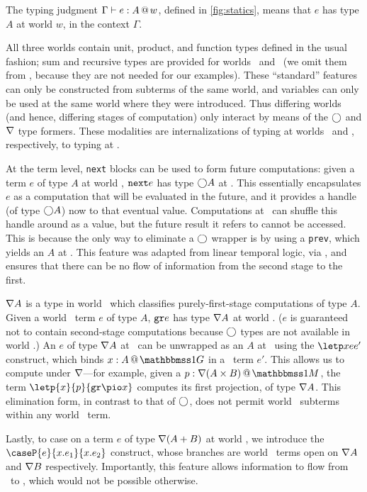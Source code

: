 \begin{abstrsyn}

The typing judgment $\Gamma{} \vdash {e}:{A}~\hspace{-0.15em}\text{@}\hspace{-0.2em}~w$, defined in \ref{fig:statics}, means that
$e$ has type $A$ at world $w$, in the context $\Gamma$. 

All three worlds contain unit, product, and function types defined in the usual fashion;
sum and recursive types are provided for worlds \bbonep\ and \bbtwo\ 
(we omit them from \bbonem, because they are not needed for our examples).
These ``standard'' features can only be constructed from subterms of the same world,
and variables can only be used at the same world where they were introduced.
Thus differing worlds (and hence, differing stages of computation) only interact by means
of the $\bigcirc$ and $\nabla$ type formers.  These modalities are internalizations
of typing at worlds \bbtwo\ and \bbonep, respectively, to typing at \bbonem.

At the term level, {\tt next} blocks can be used to form future computations:
given a term $e$ of type $A$ at world \bbtwo, ${\tt next}{e}$ has type $\bigcirc A$ at \bbonem. 
This essentially encapsulates $e$ as a computation that will be evaluated in the future, 
and it provides a handle (of type $\bigcirc A$) now to that eventual value.
Computations at \bbonem\ can shuffle this handle around as a value, but the future result it refers to cannot be accessed.
This is because the only way to eliminate a $\bigcirc$ wrapper is by using a {\tt prev}, which yields an $A$ at \bbtwo.
This feature was adapted from linear temporal logic, via \cite{davies96},
and ensures that there can be no flow of information from the second stage to the first.

$\nabla A$ is a type in world \bbonem\ which classifies purely-first-stage
computations of type $A$. Given a world \bbonep\ term $e$ of type $A$,
${\tt gr}{e}$ has type $\nabla A$ at world \bbonem. ($e$ is guaranteed not to contain
second-stage computations because $\bigcirc$ types are not available in world
\bbonep.)
An $e$ of type $\nabla A$ at \bbonem\ can be unwrapped as an $A$ at \bbonep\
using the $\letp xe{e'}$ construct, which binds $\colpure xA$ in a \bbonem\ term
$e'$. This allows us to compute under $\nabla$---for example, given a $\colmix
p{\curr(A\times B)}$, the term $\letp{x}{p}{\pure{\pio x}}$ computes its first
projection, of type $\nabla A$.
This elimination form, in contrast to that of $\bigcirc$, does not permit world \bbonem\ subterms
within any world \bbonep\ term.

Lastly, to case on a term $e$ of type $\nabla(A+B)$ at world \bbonem, we introduce the
$\caseP{e}{x.e_1}{x.e_2}$ construct, whose branches are world \bbonem\ terms
open on $\nabla{A}$ and $\nabla{B}$ respectively.
Importantly, this feature allows information to flow from \bbonep\ to \bbonem,
which would not be possible otherwise.


\end{abstrsyn}
